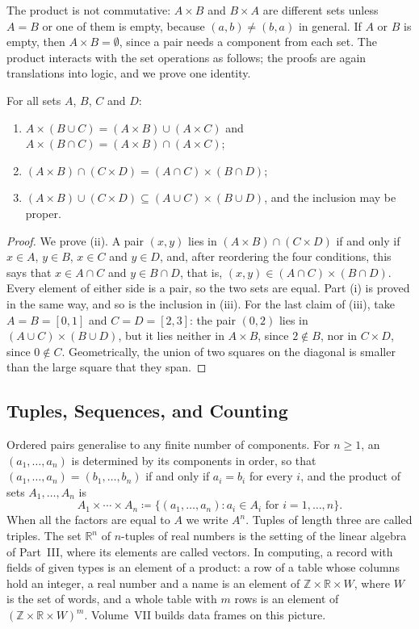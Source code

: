 The product is not commutative: $A\times B$ and $B\times A$ are different sets unless $A=B$ or one of them is empty, because $(a,b)\ne(b,a)$ in general. If $A$ or $B$ is empty, then $A\times B=\emptyset$, since a pair needs a component from each set. The product interacts with the set operations as follows; the proofs are again translations into logic, and we prove one identity.

\begin{proposition}
\label{prop:product-laws}
For all sets $A$, $B$, $C$ and $D$:
\begin{enumerate}
\item $A\times(B\cup C)=(A\times B)\cup(A\times C)$ and $A\times(B\cap C)=(A\times B)\cap(A\times C)$;
\item $(A\times B)\cap(C\times D)=(A\cap C)\times(B\cap D)$;
\item $(A\times B)\cup(C\times D)\subseteq(A\cup C)\times(B\cup D)$, and the inclusion may be proper.
\end{enumerate}
\end{proposition}

\begin{proof}
We prove (ii). A pair $(x,y)$ lies in $(A\times B)\cap(C\times D)$ if and only if $x\in A$, $y\in B$, $x\in C$ and $y\in D$, and, after reordering the four conditions, this says that $x\in A\cap C$ and $y\in B\cap D$, that is, $(x,y)\in(A\cap C)\times(B\cap D)$. Every element of either side is a pair, so the two sets are equal. Part (i) is proved in the same way, and so is the inclusion in (iii). For the last claim of (iii), take $A=B=[0,1]$ and $C=D=[2,3]$: the pair $(0,2)$ lies in $(A\cup C)\times(B\cup D)$, but it lies neither in $A\times B$, since $2\notin B$, nor in $C\times D$, since $0\notin C$. Geometrically, the union of two squares on the diagonal is smaller than the large square that they span.
\end{proof}

\subsection{Tuples, Sequences, and Counting}

Ordered pairs generalise to any finite number of components. For $n\ge1$, an  $(a_1,\ldots,a_n)$ is determined by its components in order, so that $(a_1,\ldots,a_n)=(b_1,\ldots,b_n)$ if and only if $a_i=b_i$ for every $i$, and the product of sets $A_1,\ldots,A_n$ is
\[
A_1\times\cdots\times A_n\coloneqq\{(a_1,\ldots,a_n): a_i\in A_i\text{ for }i=1,\ldots,n\}.
\]
When all the factors are equal to $A$ we write $A^n$. Tuples of length three are called triples. The set $\mathbb R^n$ of $n$-tuples of real numbers is the setting of the linear algebra of Part~III, where its elements are called vectors. In computing, a record with fields of given types is an element of a product: a row of a table whose columns hold an integer, a real number and a name is an element of $\mathbb Z\times\mathbb R\times W$, where $W$ is the set of words, and a whole table with $m$ rows is an element of $(\mathbb Z\times\mathbb R\times W)^m$. Volume~VII builds data frames on this picture.

